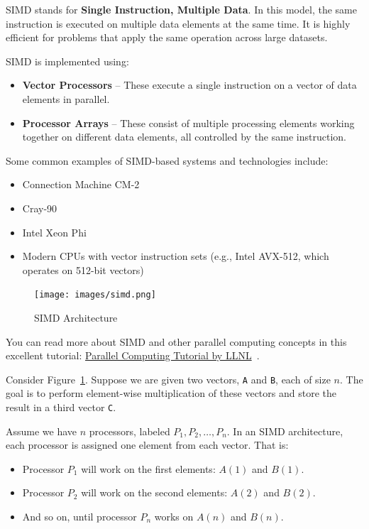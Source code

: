 \documentclass[12pt]{book}
\begin{document}
SIMD stands for \textbf{Single Instruction, Multiple Data}. In this model, the same instruction is executed on multiple data elements at the same time. It is highly efficient for problems that apply the same operation across large datasets.

SIMD is implemented using:

\begin{itemize}
    \item \textbf{Vector Processors} – These execute a single instruction on a vector of data elements in parallel.
    \item \textbf{Processor Arrays} – These consist of multiple processing elements working together on different data elements, all controlled by the same instruction.
\end{itemize}

Some common examples of SIMD-based systems and technologies include:
\begin{itemize}
    \item Connection Machine CM-2
    \item Cray-90
    \item Intel Xeon Phi
    \item Modern CPUs with vector instruction sets (e.g., Intel AVX-512, which operates on 512-bit vectors)
\end{itemize}

\begin{figure}[H]
    \centering
    \texttt{[image: images/simd.png]}
    \caption{SIMD Architecture}
    \label{fig:simd}
\end{figure}

You can read more about SIMD and other parallel computing concepts in this excellent tutorial:  
\href{http://www.llnl.gov/computing/tutorials/parallel_comp/}{Parallel Computing Tutorial by LLNL}~\cite{llnl-parallel}.

\bigskip

Consider Figure~\ref{fig:simd}. Suppose we are given two vectors, \texttt{A} and \texttt{B}, each of size $n$. The goal is to perform element-wise multiplication of these vectors and store the result in a third vector \texttt{C}.

Assume we have $n$ processors, labeled $P_1, P_2, \dots, P_n$. In an SIMD architecture, each processor is assigned one element from each vector. That is:

\begin{itemize}
    \item Processor $P_1$ will work on the first elements: $A(1)$ and $B(1)$.
    \item Processor $P_2$ will work on the second elements: $A(2)$ and $B(2)$.
    \item And so on, until processor $P_n$ works on $A(n)$ and $B(n)$.
\end{itemize}
\end{document}
